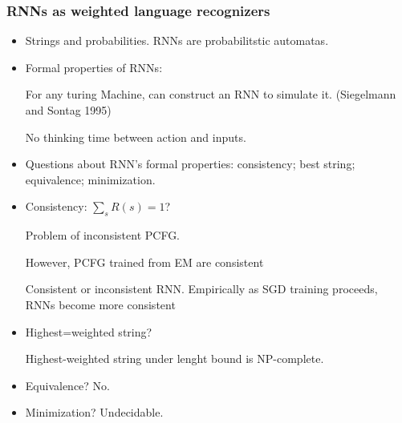 \subsubsection{RNNs as weighted language recognizers \cite{Chen2018Recurrent}}
 \begin{itemize}
 	\item Strings and probabilities. RNNs are probabilitstic automatas.
 	\item Formal properties of RNNs:
 	
 	For any turing Machine, can construct an RNN to simulate it. (Siegelmann and Sontag 1995)
 	
 	No thinking time between action and inputs.
 	
 	\item Questions about RNN's formal properties: consistency; best string; equivalence; minimization. 
 	
 	\item Consistency: $\sum_s R(s) = 1$?
 	
 	Problem of inconsistent PCFG.
 	
 	However, PCFG trained from EM are consistent

 	
 	Consistent or inconsistent RNN. Empirically as SGD training proceeds, RNNs become more consistent
 	
 	\item Highest=weighted string?
 	
 	Highest-weighted string under lenght bound is NP-complete.
 	
 	\item Equivalence? No. 
 	
 	\item Minimization? Undecidable.
 	
 \end{itemize}

